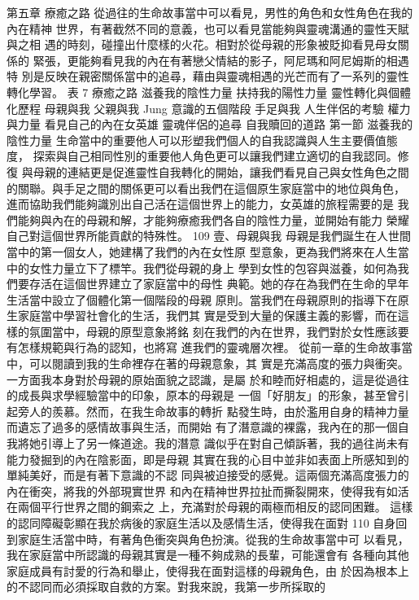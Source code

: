   
第五章 療癒之路 
從過往的生命故事當中可以看見，男性的角色和女性角色在我的內在精神
世界，有著截然不同的意義，也可以看見當能夠與靈魂溝通的靈性天賦與之相
遇的時刻，碰撞出什麼樣的火花。相對於從母親的形象被貶抑看見母女關係的
緊張，更能夠看見我的內在有著戀父情結的影子，阿尼瑪和阿尼姆斯的相遇特
別是反映在親密關係當中的追尋，藉由與靈魂相遇的光芒而有了一系列的靈性
轉化學習。 
表 7  
療癒之路 
滋養我的陰性力量 
扶持我的陽性力量 
靈性轉化與個體化歷程 
母親與我 
父親與我 
Jung 意識的五個階段 
手足與我 
人生伴侶的考驗 
權力與力量 
看見自己的內在女英雄 靈魂伴侶的追尋 
自我贖回的道路 
第一節 滋養我的陰性力量 
生命當中的重要他人可以形塑我們個人的自我認識與人生主要價值態度，
探索與自己相同性別的重要他人角色更可以讓我們建立適切的自我認同。修復
與母親的連結更是促進靈性自我轉化的開始，讓我們看見自己與女性角色之間
的關聯。與手足之間的關係更可以看出我們在這個原生家庭當中的地位與角色，
進而協助我們能夠識別出自己活在這個世界上的能力，女英雄的旅程需要的是
我們能夠與內在的母親和解，才能夠療癒我們各自的陰性力量，並開始有能力
榮耀自己對這個世界所能貢獻的特殊性。 
109 
壹、母親與我 
母親是我們誕生在人世間當中的第一個女人，她建構了我們的內在女性原
型意象，更為我們將來在人生當中的女性力量立下了標竿。我們從母親的身上
學到女性的包容與滋養，如何為我們要存活在這個世界建立了家庭當中的母性
典範。她的存在為我們在生命的早年生活當中設立了個體化第一個階段的母親
原則。當我們在母親原則的指導下在原生家庭當中學習社會化的生活，我們其
實是受到大量的保護主義的影響，而在這樣的氛圍當中，母親的原型意象將銘
刻在我們的內在世界，我們對於女性應該要有怎樣規範與行為的認知，也將寫
進我們的靈魂層次裡。 
從前一章的生命故事當中，可以閱讀到我的生命裡存在著的母親意象，其
實是充滿高度的張力與衝突。一方面我本身對於母親的原始面貌之認識，是屬
於和睦而好相處的，這是從過往的成長與求學經驗當中的印象，原本的母親是
一個「好朋友」的形象，甚至曾引起旁人的羨慕。然而，在我生命故事的轉折
點發生時，由於濫用自身的精神力量而遺忘了過多的感情故事與生活，而開始
有了潛意識的裸露，我內在的那一個自我將她引導上了另一條道途。我的潛意
識似乎在對自己傾訴著，我的過往尚未有能力發掘到的內在陰影面，即是母親
其實在我的心目中並非如表面上所感知到的單純美好，而是有著下意識的不認
同與被迫接受的感覺。這兩個充滿高度張力的內在衝突，將我的外部現實世界
和內在精神世界拉扯而撕裂開來，使得我有如活在兩個平行世界之間的鋼索之
上，充滿對於母親的兩極而相反的認同困難。 
這樣的認同障礙彰顯在我於病後的家庭生活以及感情生活，使得我在面對
110 
自身回到家庭生活當中時，有著角色衝突與角色扮演。從我的生命故事當中可
以看見，我在家庭當中所認識的母親其實是一種不夠成熟的長輩，可能還會有
各種向其他家庭成員有討愛的行為和舉止，使得我在面對這樣的母親角色，由
於因為根本上的不認同而必須採取自救的方案。對我來說，我第一步所採取的
